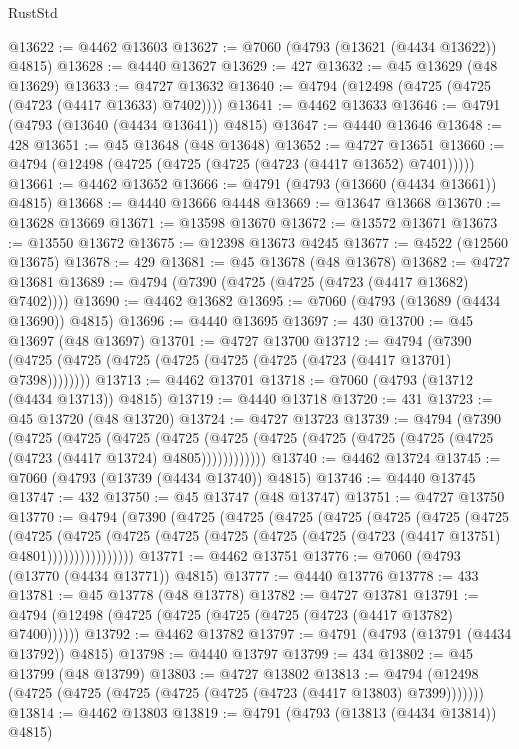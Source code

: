 \begin{lexlean}{RustStd}
\begin{coremodule}
@13622 := @4462 @13603
@13627 := @7060 (@4793 (@13621 (@4434 @13622)) @4815)
@13628 := @4440 @13627
@13629 := 427
@13632 := @45 @13629 (@48 @13629)
@13633 := @4727 @13632
@13640 := @4794 (@12498 (@4725 (@4725 (@4723 (@4417 @13633) @7402))))
@13641 := @4462 @13633
@13646 := @4791 (@4793 (@13640 (@4434 @13641)) @4815)
@13647 := @4440 @13646
@13648 := 428
@13651 := @45 @13648 (@48 @13648)
@13652 := @4727 @13651
@13660 := @4794 (@12498 (@4725 (@4725 (@4725 (@4723 (@4417 @13652) @7401)))))
@13661 := @4462 @13652
@13666 := @4791 (@4793 (@13660 (@4434 @13661)) @4815)
@13668 := @4440 @13666 @4448
@13669 := @13647 @13668
@13670 := @13628 @13669
@13671 := @13598 @13670
@13672 := @13572 @13671
@13673 := @13550 @13672
@13675 := @12398 @13673 @4245
@13677 := @4522 (@12560 @13675)
@13678 := 429
@13681 := @45 @13678 (@48 @13678)
@13682 := @4727 @13681
@13689 := @4794 (@7390 (@4725 (@4725 (@4723 (@4417 @13682) @7402))))
@13690 := @4462 @13682
@13695 := @7060 (@4793 (@13689 (@4434 @13690)) @4815)
@13696 := @4440 @13695
@13697 := 430
@13700 := @45 @13697 (@48 @13697)
@13701 := @4727 @13700
@13712 := @4794 (@7390 (@4725 (@4725 (@4725 (@4725 (@4725 (@4725 (@4723 (@4417 @13701) @7398))))))))
@13713 := @4462 @13701
@13718 := @7060 (@4793 (@13712 (@4434 @13713)) @4815)
@13719 := @4440 @13718
@13720 := 431
@13723 := @45 @13720 (@48 @13720)
@13724 := @4727 @13723
@13739 := @4794
    (@7390
      (@4725
        (@4725
          (@4725
            (@4725 (@4725 (@4725 (@4725 (@4725 (@4725 (@4725 (@4723 (@4417 @13724) @4805))))))))))))
@13740 := @4462 @13724
@13745 := @7060 (@4793 (@13739 (@4434 @13740)) @4815)
@13746 := @4440 @13745
@13747 := 432
@13750 := @45 @13747 (@48 @13747)
@13751 := @4727 @13750
@13770 := @4794
    (@7390
      (@4725
        (@4725
          (@4725
            (@4725
              (@4725
                (@4725
                  (@4725
                    (@4725
                      (@4725
                        (@4725
                          (@4725 (@4725 (@4725 (@4725 (@4723 (@4417 @13751) @4801))))))))))))))))
@13771 := @4462 @13751
@13776 := @7060 (@4793 (@13770 (@4434 @13771)) @4815)
@13777 := @4440 @13776
@13778 := 433
@13781 := @45 @13778 (@48 @13778)
@13782 := @4727 @13781
@13791 := @4794 (@12498 (@4725 (@4725 (@4725 (@4725 (@4723 (@4417 @13782) @7400))))))
@13792 := @4462 @13782
@13797 := @4791 (@4793 (@13791 (@4434 @13792)) @4815)
@13798 := @4440 @13797
@13799 := 434
@13802 := @45 @13799 (@48 @13799)
@13803 := @4727 @13802
@13813 := @4794 (@12498 (@4725 (@4725 (@4725 (@4725 (@4725 (@4723 (@4417 @13803) @7399)))))))
@13814 := @4462 @13803
@13819 := @4791 (@4793 (@13813 (@4434 @13814)) @4815)

\end{coremodule}
\end{lexlean}
